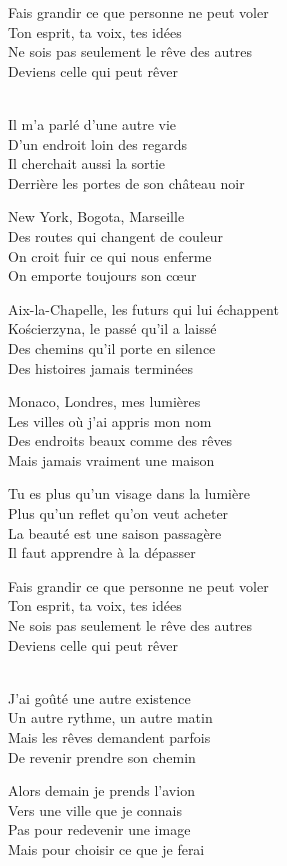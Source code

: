 \begin{lyrics}
Fais grandir ce que personne ne peut voler\\
Ton esprit, ta voix, tes idées\\
Ne sois pas seulement le rêve des autres\\
Deviens celle qui peut rêver

\\
Il m’a parlé d’une autre vie\\
D’un endroit loin des regards\\
Il cherchait aussi la sortie\\
Derrière les portes de son château noir

New York, Bogota, Marseille\\
Des routes qui changent de couleur\\
On croit fuir ce qui nous enferme\\
On emporte toujours son cœur

Aix-la-Chapelle, les futurs qui lui échappent\\
Kościerzyna, le passé qu’il a laissé\\
Des chemins qu’il porte en silence\\
Des histoires jamais terminées

Monaco, Londres, mes lumières\\
Les villes où j’ai appris mon nom\\
Des endroits beaux comme des rêves\\
Mais jamais vraiment une maison

Tu es plus qu’un visage dans la lumière\\
Plus qu’un reflet qu’on veut acheter\\
La beauté est une saison passagère\\
Il faut apprendre à la dépasser

Fais grandir ce que personne ne peut voler\\
Ton esprit, ta voix, tes idées\\
Ne sois pas seulement le rêve des autres\\
Deviens celle qui peut rêver

\\
J’ai goûté une autre existence\\
Un autre rythme, un autre matin\\
Mais les rêves demandent parfois\\
De revenir prendre son chemin

Alors demain je prends l’avion\\
Vers une ville que je connais\\
Pas pour redevenir une image\\
Mais pour choisir ce que je ferai
\end{lyrics}

